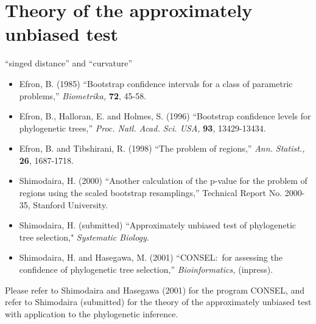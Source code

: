 \documentclass[12pt]{article}
\begin{document}
\section{Theory of the approximately unbiased test}

``singed distance'' and ``curvature''

\begin{itemize}
 \item Efron, B. (1985) ``Bootstrap confidence intervals for a class of
       parametric problems,'' {\it Biometrika,} {\bf 72}, 45-58.
 \item Efron, B., Halloran, E. and Holmes, S. (1996) ``Bootstrap
       confidence levels for phylogenetic
       trees,'' {\it Proc. Natl. Acad. Sci. USA,} {\bf 93}, 13429-13434.
 \item Efron, B. and Tibshirani, R. (1998) ``The problem of
       regions,'' {\it Ann. Statist.,} {\bf 26}, 1687-1718.
 \item Shimodaira, H. (2000) ``Another calculation of the p-value for the
       problem of regions using the scaled bootstrap
       resamplings,'' Technical Report No. 2000-35, Stanford University.
 \item Shimodaira, H. (submitted) ``Approximately unbiased test of
       phylogenetic tree selection," {\it Systematic Biology}.
 \item Shimodaira, H. and Hasegawa, M. (2001) ``CONSEL:~for assessing the
       confidence of phylogenetic tree selection,''  {\it
       Bioinformatics,} (inpress).
\end{itemize}

Please refer to Shimodaira and Hasegawa (2001) for the program CONSEL,
and refer to Shimodaira (submitted) for the theory of the approximately
unbiased test with application to the phylogenetic inference.
\end{document}
